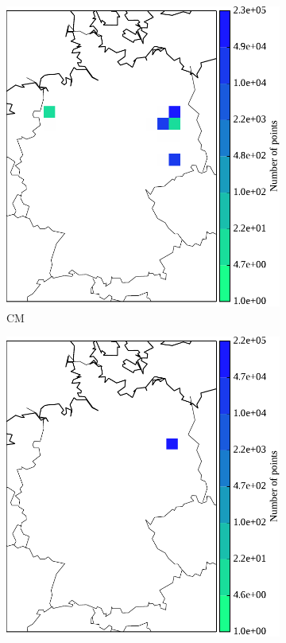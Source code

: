 \begin{figure}%
	\begin{subfigure}[b]{.23\textwidth}
	\centering
	\includegraphics[width=\textwidth]{pix/freq_COM_ger_berlin.pdf}
		\caption{CM}
	\end{subfigure}
	\begin{subfigure}[b]{.23\textwidth}
	\centering
	\includegraphics[width=\textwidth]{pix/freq_RW_ger_berlin.pdf}

\end{subfigure}
\end{figure}
